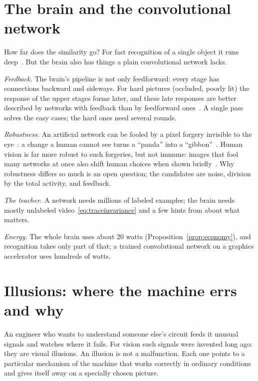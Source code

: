 \section{The brain and the convolutional network}

How far does the similarity go? For fast recognition of a single object it runs deep~\cite{Yamins2014}. But the brain also has things a plain convolutional network lacks.

\emph{Feedback.} The brain's pipeline is not only feedforward: every stage has connections backward and sideways. For hard pictures (occluded, poorly lit) the response of the upper stages forms later, and these late responses are better described by networks with feedback than by feedforward ones~\cite{Kar2019}. A single pass solves the easy cases; the hard ones need several rounds.

\emph{Robustness.} An artificial network can be fooled by a pixel forgery invisible to the eye~\cite{Szegedy2014}: a change a human cannot see turns a ``panda'' into a ``gibbon''~\cite{Goodfellow2015}. Human vision is far more robust to such forgeries, but not immune: images that fool many networks at once also shift human choices when shown briefly~\cite{Elsayed2018}. Why robustness differs so much is an open question; the candidates are noise, division by the total activity, and feedback.

\emph{The teacher.} A network needs millions of labeled examples; the brain needs mostly unlabeled video~\eqref{eq:traceinvariance} and a few hints from  about what matters.

\emph{Energy.} The whole brain uses about $20$ watts (Proposition~\ref{prop:economy}), and recognition takes only part of that; a trained convolutional network on a graphics accelerator uses hundreds of watts.

\section{Illusions: where the machine errs and why}
\label{sec:illusions}

An engineer who wants to understand someone else's circuit feeds it unusual signals and watches where it fails. For vision such signals were invented long ago: they are visual illusions. An illusion is not a malfunction. Each one points to a particular mechanism of the machine that works correctly in ordinary conditions and gives itself away on a specially chosen picture.

